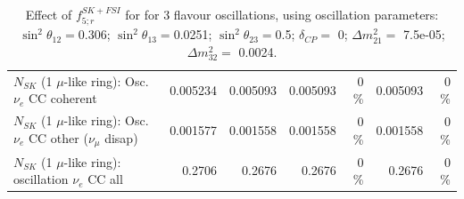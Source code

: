 \begin{table}
\begin{tabular}{| l | r | r | r  r | r  r |}
                          $N_{SK}$ (1 $\mu$-like ring): Osc. $\nu_e$ CC coherent &        0.005234 &        0.005093 &        0.005093 &        0 \%  &        0.005093 &        0 \%  \\ 
           $N_{SK}$ (1 $\mu$-like ring): Osc. $\nu_e$ CC other ($\nu_\mu$ disap) &        0.001577 &        0.001558 &        0.001558 &        0 \%  &        0.001558 &        0 \%  \\ 
                        $N_{SK}$ (1 $\mu$-like ring): oscillation $\nu_e$ CC all &          0.2706 &          0.2676 &          0.2676 &        0 \%  &          0.2676 &        0 \%  \\ 
\hline
\hline
\end{tabular}
\caption{ Effect of $f_{5; r}^{SK+FSI}$ for for 3 flavour oscillations, using oscillation parameters:  $\sin^2\theta_{12} = $0.306; $\sin^2\theta_{13} = $0.0251; $\sin^2\theta_{23} = $0.5; $\delta_{CP} = $        0; $\Delta m^2_{21} = $    7.5e-05; $\Delta m^2_{32} = $    0.0024. }
\label{tab:num_skdetfsi_005_1RmuT_3f_osc_t13:0.0251_spectralreco_spectraltrue}
\end{table}
\clearpage

